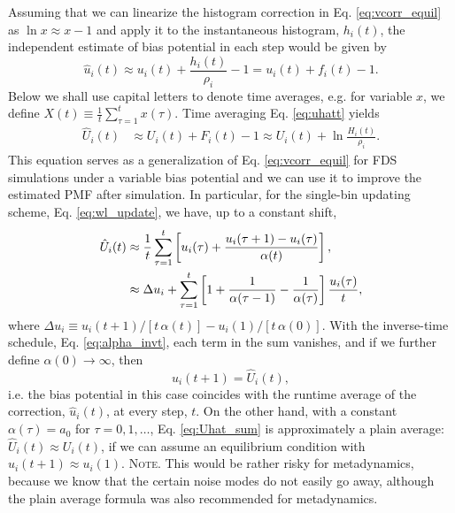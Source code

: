 \documentclass[reprint, superscriptaddress, floatfix]{revtex4-1}
\newcommand{\note}[1]{{\color{DarkGreen}\footnotesize \textsc{Note.} #1}}
\begin{document}
%
Assuming that we can linearize the histogram correction
in Eq. \eqref{eq:vcorr_equil} as
$\ln x \approx x - 1$ %
and apply it to the instantaneous histogram, $h_i(t)$,
the independent estimate of bias potential in each step
would be given by
%
\begin{equation}
  \hat u_i(t) \approx u_i(t) + \frac{ h_i(t) } { \rho_i } - 1
  = u_i(t) + f_i(t) - 1
  .
  \label{eq:uhatt}
\end{equation}
%
Below we shall use capital letters to denote
time averages, e.g. for variable $x$, we define
$X(t) \equiv \frac{1}{t} \sum_{\tau=1}^t x(\tau)$.
%
Time averaging Eq. \eqref{eq:uhatt} yields
\begin{align}
  \hat U_i(t)
  &\approx
  U_i (t)
  + F_i(t) - 1
  \approx
  U_i(t)
  + \ln \frac{ H_i(t) } { \rho_i }
  .
  \label{eq:uhatav}
\end{align}
%
This equation serves as
a generalization of Eq. \eqref{eq:vcorr_equil}
for FDS simulations under a variable bias potential
and we can use it to improve the estimated PMF
after simulation.
%
In particular, for the single-bin updating scheme,
Eq. \eqref{eq:wl_update},
we have, up to a constant shift,
%
\begin{align}
  \hat U_i(t)
  &\approx
  \frac{1}{t} \sum_{\tau=1}^t
  \left[
    u_i(\tau) +
    \frac{ u_i(\tau + 1) - u_i(\tau) } { \alpha(t) }
  \right]
  ,
  \notag
  \\
  &\approx
  \Delta u_i
  +
  \sum_{\tau=1}^t
  \left[
    1 + \frac{1}{\alpha(\tau - 1)} - \frac{1}{\alpha(\tau)}
  \right]
  \frac{ u_i(\tau) } {t}
  ,
  \label{eq:Uhat_sum}
\end{align}
where
$\Delta u_i \equiv u_i(t+1) /[t \, \alpha(t)]
- u_i(1)/[t \, \alpha(0)]$.
%
With the inverse-time schedule, Eq. \eqref{eq:alpha_invt},
each term in the sum vanishes,
and if we further define $\alpha(0) \to \infty$,
then
$$
u_i(t+1) = \hat U_i(t),
$$
i.e. the bias potential in this case coincides with
the runtime average of the correction, $\hat u_i(t)$,
at every step, $t$.
%
On the other hand,
with a constant $\alpha(\tau) = a_0$ for $\tau = 0, 1, \dots$,
Eq. \eqref{eq:Uhat_sum} is approximately a plain average\cite{zhou2005}:
$\hat U_i(t) \approx U_i(t)$,
if we can assume an equilibrium condition
with $u_i(t+1) \approx u_i(1)$.
\note{This would be rather risky for metadynamics,
because we know that the certain noise modes
do not easily go away, although the plain average
formula was also recommended for metadynamics.}
\end{document}
